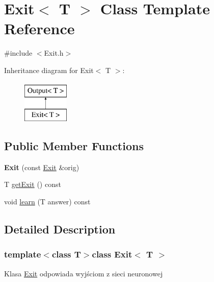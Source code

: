\hypertarget{class_exit}{\section{\-Exit$<$ \-T $>$ \-Class \-Template \-Reference}
\label{class_exit}
}


{\ttfamily \#include $<$\-Exit.\-h$>$}

\-Inheritance diagram for \-Exit$<$ \-T $>$\-:\begin{figure}[H]
\begin{center}
\leavevmode
\includegraphics[height=2.000000cm]{class_exit}
\end{center}
\end{figure}
\subsection*{\-Public \-Member \-Functions}
\begin{DoxyCompactItemize}
\item 
\hypertarget{class_exit_acad725c8d30560b30b7d0e12eea95ccd}{{\bfseries \-Exit} (const \hyperlink{class_exit}{\-Exit} \&orig)}\label{class_exit_acad725c8d30560b30b7d0e12eea95ccd}

\item 
\-T \hyperlink{class_exit_ace64923bf5842a32f0abbb413e0bc50f}{get\-Exit} () const 
\item 
void \hyperlink{class_exit_a7579d52eedde1485a1f812b4edad463c}{learn} (\-T answer) const 
\end{DoxyCompactItemize}


\subsection{\-Detailed \-Description}
\subsubsection*{template$<$class T$>$class Exit$<$ T $>$}

\-Klasa \hyperlink{class_exit}{\-Exit} odpowiada wyjściom z sieci neuronowej 

